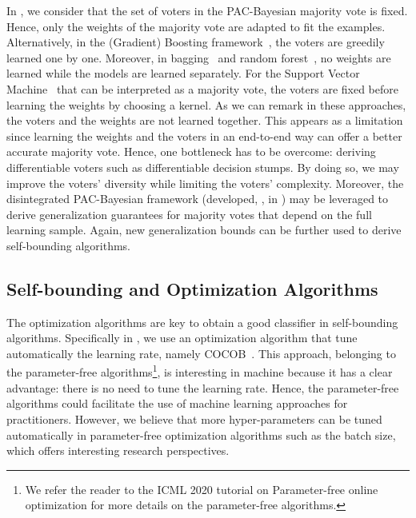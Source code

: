 In , we consider that the set of voters in the PAC-Bayesian majority vote is fixed.
Hence, only the weights of the majority vote are adapted to fit the examples.
Alternatively, in the (Gradient) Boosting framework~\citep{FreundSchapire1996,Friedman2001}, the voters are greedily learned one by one.
Moreover, in bagging~\citep{Breiman1996} and random forest~\citep{Breiman2001}, no weights are learned while the models are learned separately.
For the Support Vector Machine~\citep{GraepelHerbrichShaweTaylor2005} that can be interpreted as a majority vote, the voters are fixed before learning the weights by choosing a kernel.
As we can remark in these approaches, the voters and the weights are not learned together.
This appears as a limitation since learning the weights and the voters in an end-to-end way can offer a better accurate majority vote.
Hence, one bottleneck has to be overcome: deriving differentiable voters such as differentiable decision stumps.
By doing so, we may improve the voters' diversity while limiting the voters' complexity.
Moreover, the disintegrated PAC-Bayesian framework (developed, \eg, in ) may be leveraged to derive generalization guarantees for majority votes that depend on the full learning sample.
Again, new generalization bounds can be further used to derive self-bounding algorithms.

\subsection*{Self-bounding and Optimization Algorithms}

The optimization algorithms are key to obtain a good classifier in self-bounding algorithms.
Specifically in , we use an optimization algorithm that tune automatically the learning rate, namely COCOB~\citep{OrabonaTommasi2017}.
This approach, belonging to the parameter-free algorithms\footnote{We refer the reader to the ICML 2020 tutorial on Parameter-free online optimization for more details on the parameter-free algorithms.}, is interesting in machine because it has a clear advantage: there is no need to tune the learning rate.
Hence, the parameter-free algorithms could facilitate the use of machine learning approaches for practitioners.
However, we believe that more hyper-parameters can be tuned automatically in parameter-free optimization algorithms such as the batch size, which offers interesting research perspectives.

